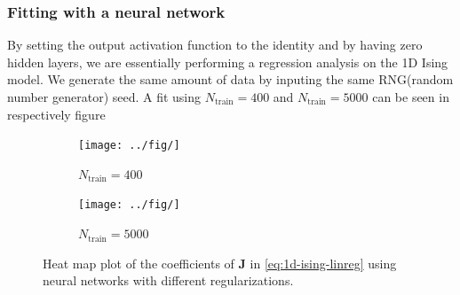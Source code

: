 \subsubsection{Fitting with a neural network}
By setting the output activation function to the identity and by having zero hidden layers, we are essentially performing a regression analysis on the 1D Ising model. We generate the same amount of data by inputing the same RNG(random number generator) seed. A fit using $N_\mathrm{train}=400$ and $N_\mathrm{train}=5000$ can be seen in respectively figure 

\begin{figure}[H]
    \centering
    \begin{subfigure}[b]{0.5\textwidth}
        \centering
        \texttt{[image: ../fig/]}
        \caption{$N_\mathrm{train}=400$}
        \label{fig:mlp-reg-heatmap400}
    \end{subfigure}%
    \begin{subfigure}[b]{0.5\textwidth}
        \centering
        \texttt{[image: ../fig/]}
        \caption{$N_\mathrm{train}=5000$}
        \label{fig:mlp-reg-heatmap5000}
    \end{subfigure}
    \caption{Heat map plot of the coefficients of $\bm{J}$ in \eqref{eq:1d-ising-linreg} using neural networks with different regularizations.}
    \label{fig:mlp-coefs}
\end{figure}

